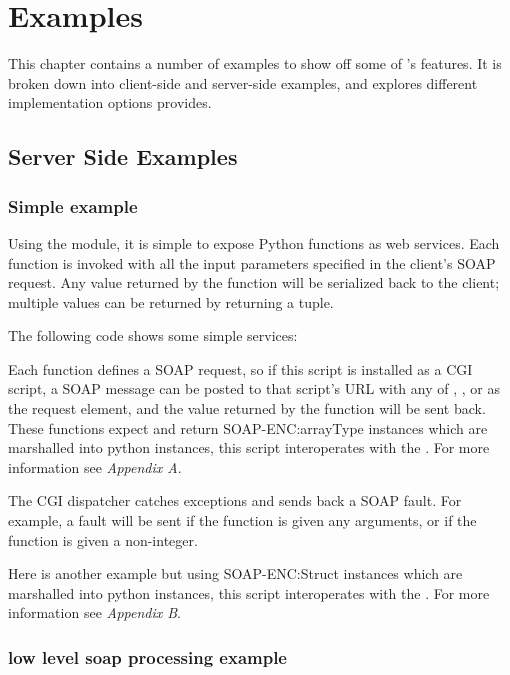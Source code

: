 \chapter{Examples}

This chapter contains a number of examples to show off some of \ZSI{}'s
features.  It is broken down into client-side and server-side examples, and
explores different implementation options \ZSI{} provides.

\section{Server Side Examples}
\subsection{Simple example}
Using the  module, it is simple to expose Python functions
as web services.  Each function is invoked with all the input parameters
specified in the client's SOAP request.  Any value returned by the function will
be serialized back to the client; multiple values can be returned by returning a
tuple.

The following code shows some simple services:



Each function defines a SOAP request, so if this script is installed
as a CGI script, a SOAP message can be posted to that script's URL with any of
, , or  as the request element,
and the value returned by the function will be sent back.  These functions
expect and return SOAP-ENC:arrayType instances which are marshalled into python
 instances, this script interoperates with the
.  For more information see \emph{Appendix A}.

The \ZSI{} CGI dispatcher catches exceptions and sends back a SOAP fault.
For example, a fault will be sent if the   function is given any
arguments, or if the  function is given a non-integer.

Here is another example but using SOAP-ENC:Struct instances which are marshalled
into python  instances, this script interoperates with the
.  For more information see \emph{Appendix B}.



\subsection{low level soap processing example}

